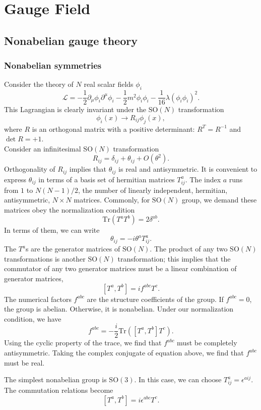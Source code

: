 \chapter{Gauge Field}
\section{Nonabelian gauge theory}
\subsection{Nonabelian symmetries}
Consider the theory of $N$ real scalar fields $\phi_i$
\[\mathcal{L} = -\frac{1}{2}\partial_{\mu}\phi_i \partial^{\mu}\phi_i - \frac{1}{2}m^2\phi_i\phi_i - \frac{1}{16}\lambda(\phi_i\phi_i)^2.\]
This Lagrangian is clearly invariant under the $\mathrm{SO}(N)$ transformation
\[\phi_i(x) \to R_{ij}\phi_j(x),\]
where $R$ is an orthogonal matrix with a positive determinant: $R^T = R^{-1}$ and $\det R = +1$.
\\
Consider an infinitesimal $\mathrm{SO}(N)$ transformation
\[R_{ij} = \delta_{ij} + \theta_{ij} + O(\theta^2).\]
Orthogonality of $R_{ij}$ implies that $\theta_{ij}$ is real and antisymmetric. It is convenient to express $\theta_{ij}$ in terms of a basis set of hermitian matrices $T^a_{ij}$. The index $a$ runs from $1$ to $N(N-1)/2$, the number of linearly independent, hermitian, antisymmetric, $N \times N$ matrices. Commonly, for $\mathrm{SO}(N)$ group, we demand these matrices obey the normalization condition
\[\mathrm{Tr}(T^a T^b) = 2\delta^{ab}.\]
In terms of them, we can write
\[\theta_{ij} = -i\theta^a T^a_{ij}.\]
The $T^a$s are the generator matrices of $\mathrm{SO}(N)$. The product of any two $\mathrm{SO}(N)$ transformations is another $\mathrm{SO}(N)$ transformation; this implies that the commutator of any two generator matrices must be a linear combination of generator matrices,
\[[T^a,T^b] = if^{abc}T^c.\]
The numerical factors $f^{abc}$ are the structure coefficients of the group. If $f^{abc} = 0$, the group is abelian. Otherwise, it is nonabelian. Under our normalization condition, we have
\[f^{abc} = -\frac{i}{2} \mathrm{Tr} \left([T^a,T^b]T^c \right).\]
Using the cyclic property of the trace, we find that $f^{abc}$ must be completely antisymmetric. Taking the complex conjugate of equation above, we find that $f^{abc}$ must be real.

\begin{example}
The simplest nonabelian group is $\mathrm{SO}(3)$. In this case, we can choose $T^a_{ij} = \epsilon^{aij}$. The commutation relations become
\[[T^a,T^b] = i\epsilon^{abc}T^c.\]
\end{example}

